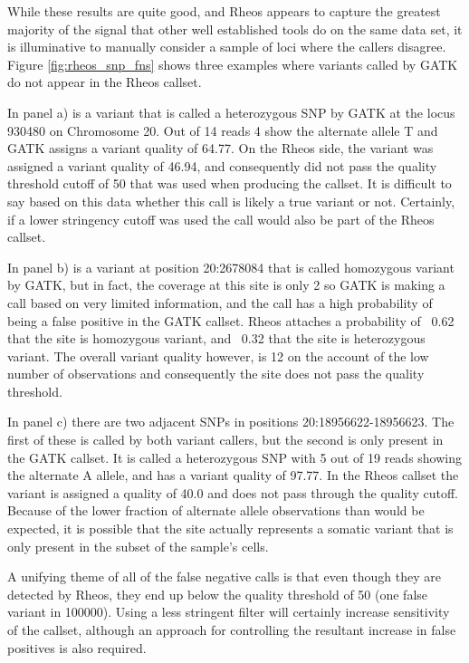 While these results are quite good, and Rheos appears to capture the greatest majority of the signal that other well established tools do on the same data set, it is illuminative to manually consider a sample of loci where the callers disagree. Figure \ref{fig:rheos_snp_fns} shows three examples where variants called by GATK do not appear in the Rheos callset. 

In panel a) is a variant that is called a heterozygous SNP by GATK at the locus 930480 on Chromosome 20. Out of 14 reads 4 show the alternate allele T and GATK assigns a variant quality of 64.77. On the Rheos side, the variant was assigned a variant quality of 46.94, and consequently did not pass the quality threshold cutoff of 50 that was used when producing the callset. It is difficult to say based on this data whether this call is likely a true variant or not. Certainly, if a lower stringency cutoff was used the call would also be part of the Rheos callset.

In panel b) is a variant at position 20:2678084 that is called homozygous variant by GATK, but in fact, the coverage at this site is only 2 so GATK is making a call based on very limited information, and the call has a high probability of being a false positive in the GATK callset. Rheos attaches a probability of ~0.62 that the site is homozygous variant, and ~0.32 that the site is heterozygous variant. The overall variant quality however, is 12 on the account of the low number of observations and consequently the site does not pass the quality threshold.

In panel c) there are two adjacent SNPs in positions 20:18956622-18956623. The first of these is called by both variant callers, but the second is only present in the GATK callset. It is called a heterozygous SNP with 5 out of 19 reads showing the alternate A allele, and has a variant quality of 97.77. In the Rheos callset the variant is assigned a quality of 40.0 and does not pass through the quality cutoff. Because of the lower fraction of alternate allele observations than would be expected, it is possible that the site actually represents a somatic variant that is only present in the subset of the sample's cells.

A unifying theme of all of the false negative calls is that even though they are detected by Rheos, they end up below the quality threshold of 50 (one false variant in 100000). Using a less stringent filter will certainly increase sensitivity of the callset, although an approach for controlling the resultant increase in false positives is also required.

